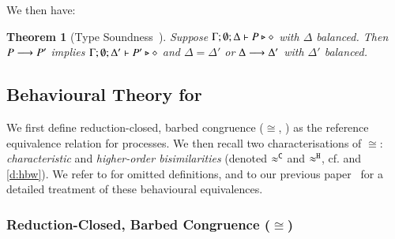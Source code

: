 \documentclass[preprint,11pt]{elsarticle}
\newtheorem{theorem}{Theorem}[section]
\begin{document}



We then have:

\begin{theorem}[Type Soundness~\cite{KouzapasPY17}]\label{t:sr}\rm
%
			Suppose $\Gamma; \emptyset; \Delta \vdash P \triangleright \diamond$
			with
			$\Delta$ balanced. 
			Then $P \longrightarrow P'$ implies $\Gamma; \emptyset; \Delta'  \vdash P' \triangleright \diamond$
			and $\Delta = \Delta'$ or $\Delta \longrightarrow \Delta'$
			with $\Delta'$ balanced. 
\end{theorem}





\subsection{Behavioural Theory for \HOp}\label{sec:bt}
%

We first define reduction-closed, barbed congruence ($\cong$, ) as the
reference equivalence relation for \HOp processes.
We then recall two characterisations of $\cong$:
\emph{characteristic} and
\emph{higher-order bisimilarities}   
 (denoted $\approx^\mathtt{C}$ and $\approx^\mathtt{H}$, cf.  and \ref{d:hbw}). 
 We refer to  for omitted definitions, 
 and to our previous paper~\cite{KouzapasPY17} for a detailed treatment of these behavioural equivalences. 

\subsubsection{Reduction-Closed, Barbed Congruence ($\cong$)}
\label{subsec:rc}
\end{document}
